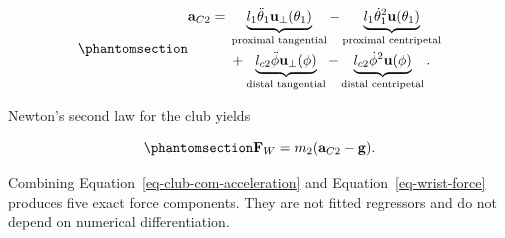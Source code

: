 \documentclass[
  letterpaper,
]{report}
\begin{document}
\begin{equation}\phantomsection\label{eq-club-com-acceleration}{
\begin{aligned}
\mathbf a_{C2}={}&
\underbrace{l_1\ddot\theta_1\mathbf u_\perp(\theta_1)}_{
\text{proximal tangential}}
-\underbrace{l_1\dot\theta_1^2\mathbf u(\theta_1)}_{
\text{proximal centripetal}}\\
&+\underbrace{l_{c2}\ddot\phi\mathbf u_\perp(\phi)}_{
\text{distal tangential}}
-\underbrace{l_{c2}\dot\phi^2\mathbf u(\phi)}_{
\text{distal centripetal}}.
\end{aligned}
}\end{equation}

Newton's second law for the club yields

\begin{equation}\phantomsection\label{eq-wrist-force}{
\mathbf F_W=m_2(\mathbf a_{C2}-\mathbf g).
}\end{equation}

Combining Equation~\ref{eq-club-com-acceleration} and
Equation~\ref{eq-wrist-force} produces five exact force components. They
are not fitted regressors and do not depend on numerical
differentiation.
\end{document}
